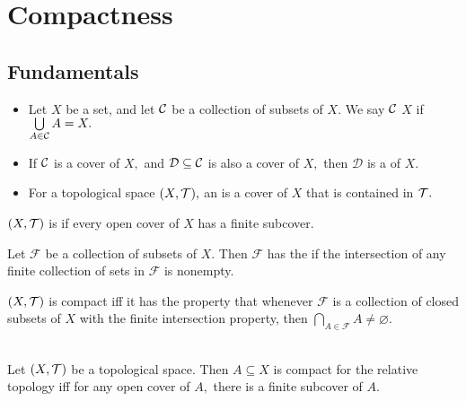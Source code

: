 \chapter{Compactness}

\section{Fundamentals}

\begin{defn}
\begin{itemize}
\item Let $X$ be a set, and let $\mathcal{C}$ be a collection of subsets of $X.$ We say $\mathcal{C}$  $X$ if $\bigcup\limits_{A\in\mathcal{C}}A=X.$
\item If $\mathcal{C}$ is a cover of $X,$ and $\mathcal{D}\subseteq\mathcal{C}$ is also a cover of $X,$ then $\mathcal{D}$ is a  of $X.$
\item For a topological space $(X,\mathcal{T}),$ an  is a cover of $X$ that is contained in $\mathcal{T}.$
\end{itemize}
\end{defn}

\begin{defn}
$(X,\mathcal{T})$ is  if every open cover of $X$ has a finite subcover.
\end{defn}

\begin{defn}
Let $\mathcal{F}$ be a collection of subsets of $X.$ Then $\mathcal{F}$ has the  if the intersection of any finite collection of sets in $\mathcal{F}$ is nonempty.
\end{defn}

\begin{prop}
$(X,\mathcal{T})$ is compact iff it has the property that whenever $\mathcal{F}$ is a collection of closed subsets of $X$ with the finite intersection property, then $\bigcap\limits_{A\in\mathcal{F}}A\neq\varnothing.$ \\ \\
\end{prop}

\begin{prop}
Let $(X,\mathcal{T})$ be a topological space. Then $A\subseteq X$ is compact for the relative topology iff for any open cover of $A,$ there is a finite subcover of $A.$ \\ \\
\end{prop}

